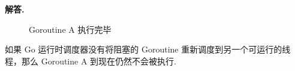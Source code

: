 \documentclass[12pt, a4paper, oneside]{ctexart}
\newenvironment{solution}{\par\noindent\textbf{解答. }}{\par}
\begin{document}
\begin{solution}
\begin{itemize}
\begin{figure}[!htbp]
                \caption{Goroutine A 执行完毕}
                \label{fig7}
            \end{figure}
    \end{itemize}
    \newpage
    如果 Go 运行时调度器没有将阻塞的 Goroutine 重新调度到另一个可运行的线程，那么 Goroutine A 到现在仍然不会被执行.
\end{solution}
\end{document}
